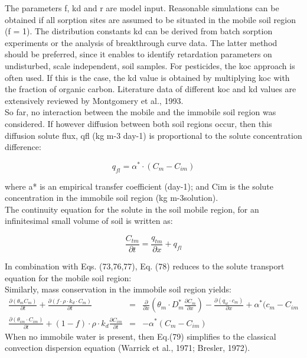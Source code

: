 The parameters f, kd and r are model input. Reasonable simulations can be obtained if all sorption sites are assumed to be situated in the mobile soil region (f = 1). The distribution constants kd can be derived from batch sorption experiments or the analysis of breakthrough curve data. The latter method should be preferred, since it enables to identify retardation parameters on undisturbed, scale independent, soil samples. For pesticides, the koc approach is often used. If this is the case, the kd value is obtained by multiplying koc with the fraction of organic carbon. Literature data of different koc and kd values are extensively reviewed by Montgomery et al., 1993.
\\
So far, no interaction between the mobile and the immobile soil region was considered. If however diffusion between both soil regions occur, then this diffusion solute flux, qfl (kg m-3 day-1) is proportional to the solute concentration difference:

\begin{equation}
q_{fl} = \alpha^* \cdot (C_m - C_{im})
\end{equation}

where a* is an empirical transfer coefficient (day-1); and Cim is the solute concentration in the immobile soil region (kg m-3solution).
\\
The continuity equation for the solute in the soil mobile region, for an infinitesimal small volume of soil is written as:

\begin{equation}
\frac{C_{tm}}{\partial t} = \frac{q_{tm}}{\partial x} + q_{fl}
\end{equation}

In combination with Eqs. (73,76,77), Eq. (78) reduces to the solute transport equation for the mobile soil region:
\\
Similarly, mass conservation in the immobile soil region yields:
\begin{eqnarray}
\frac{\partial (\theta_m C_m)}{\partial t} + \frac{\partial (f \cdot \rho \cdot k_d \cdot C_m)}{\partial t}  &=& 
\frac{\partial}{\partial x} \left(\theta_m \cdot D_m^* \frac{\partial C_m}{\partial x}\right) - \frac{\partial (q_w \cdot c_m)}{\partial x} + \alpha^*(c_m - C_{im}\\
\frac{\partial (\theta_{im} \cdot C_{im})}{\partial t} + (1-f)\cdot \rho \cdot k_d \frac{\partial C_{im}}{\partial t} &= &- \alpha^*(C_m - C_{im})
\end{eqnarray}
When no immobile water is present, then Eq.(79) simplifies to the classical convection dispersion equation (Warrick et al., 1971; Bresler, 1972).

